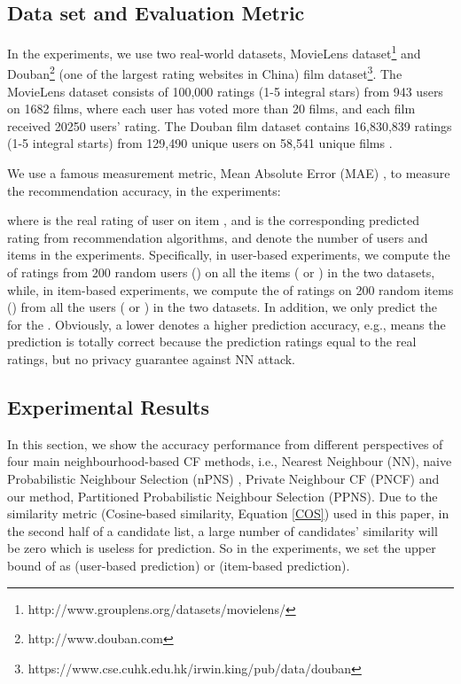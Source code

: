 \documentclass[11pt]{article}
\begin{document}
\subsection{Data set and Evaluation Metric}
In the experiments, we use two real-world datasets, MovieLens dataset\footnote{http://www.grouplens.org/datasets/movielens/} and Douban\footnote{http://www.douban.com} (one of the largest rating websites in China) film dataset\footnote{https://www.cse.cuhk.edu.hk/irwin.king/pub/data/douban}. The MovieLens dataset consists of 100,000 ratings (1-5 integral stars) from 943 users on 1682 films, where each user has voted more than 20 films, and each film received 20250 users' rating. The Douban film dataset contains 16,830,839 ratings (1-5 integral starts) from 129,490 unique users on 58,541 unique films \cite{MA2011}.

We use a famous measurement metric, Mean Absolute Error (MAE) \cite{WILLMOTT2005, ZHU2014}, to measure the recommendation accuracy, in the experiments:

where  is the real rating of user  on item , and  is the corresponding predicted rating from recommendation algorithms,  and  denote the number of users and items in the experiments. Specifically, in user-based experiments, we compute the  of ratings from 200 random users () on all the items ( or ) in the two datasets, while, in item-based experiments, we compute the  of ratings on 200 random items () from all the users ( or ) in the two datasets. In addition, we only predict the  for the . Obviously, a lower  denotes a higher prediction accuracy, e.g.,  means the prediction is totally correct because the prediction ratings equal to the real ratings, but no privacy guarantee against NN attack.


\subsection{Experimental Results}
In this section, we show the accuracy performance from different perspectives of four main neighbourhood-based CF methods, i.e.,  Nearest Neighbour (NN), naive Probabilistic Neighbour Selection (nPNS) \cite{ADAMOPOULOS2014}, Private Neighbour CF (PNCF) \cite{ZHU2014} and our method, Partitioned Probabilistic Neighbour Selection (PPNS). Due to the similarity metric (Cosine-based similarity, Equation \eqref{COS}) used in this paper, in the second half of a candidate list, a large number of candidates' similarity will be zero which is useless for prediction. So in the experiments, we set the upper bound of  as  (user-based prediction) or  (item-based prediction).
\end{document}
